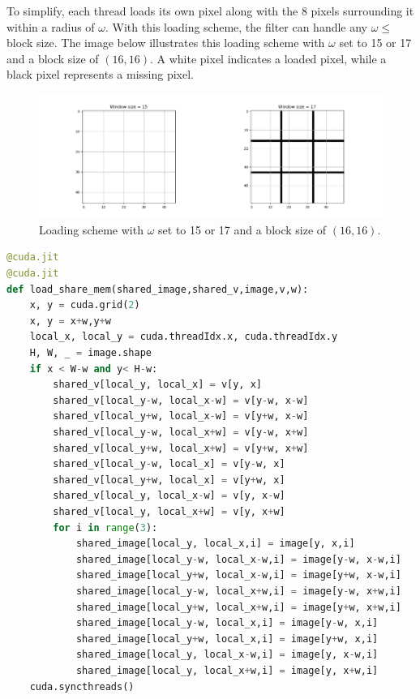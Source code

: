\documentclass{article}
\begin{document}
To simplify, each thread loads its own pixel along with the 8 pixels surrounding it within a radius of $\omega$. With this loading scheme, the filter can handle any $\omega \leq$ block size. 
The image below illustrates this loading scheme with $\omega$ set to 15 or 17 and a block size of $(16, 16)$. 
A white pixel indicates a loaded pixel, while a black pixel represents a missing pixel.


\begin{figure}[H]
    \centering
    \includegraphics[width=1\linewidth]{Compare Load.png}
    \caption{Loading scheme with $\omega$ set to 15 or 17 and a block size of $(16, 16)$.}
    \label{fig:enter-label}
\end{figure}


\begin{lstlisting}[language=Python]
@cuda.jit
@cuda.jit
def load_share_mem(shared_image,shared_v,image,v,w):
    x, y = cuda.grid(2)
    x, y = x+w,y+w
    local_x, local_y = cuda.threadIdx.x, cuda.threadIdx.y 
    H, W, _ = image.shape
    if x < W-w and y< H-w:
        shared_v[local_y, local_x] = v[y, x]
        shared_v[local_y-w, local_x-w] = v[y-w, x-w]
        shared_v[local_y+w, local_x-w] = v[y+w, x-w]
        shared_v[local_y-w, local_x+w] = v[y-w, x+w]
        shared_v[local_y+w, local_x+w] = v[y+w, x+w]
        shared_v[local_y-w, local_x] = v[y-w, x]
        shared_v[local_y+w, local_x] = v[y+w, x]
        shared_v[local_y, local_x-w] = v[y, x-w]
        shared_v[local_y, local_x+w] = v[y, x+w]
        for i in range(3):
            shared_image[local_y, local_x,i] = image[y, x,i]
            shared_image[local_y-w, local_x-w,i] = image[y-w, x-w,i]
            shared_image[local_y+w, local_x-w,i] = image[y+w, x-w,i]
            shared_image[local_y-w, local_x+w,i] = image[y-w, x+w,i]
            shared_image[local_y+w, local_x+w,i] = image[y+w, x+w,i]
            shared_image[local_y-w, local_x,i] = image[y-w, x,i]
            shared_image[local_y+w, local_x,i] = image[y+w, x,i]
            shared_image[local_y, local_x-w,i] = image[y, x-w,i]
            shared_image[local_y, local_x+w,i] = image[y, x+w,i]
    cuda.syncthreads()
\end{lstlisting}
\end{document}
